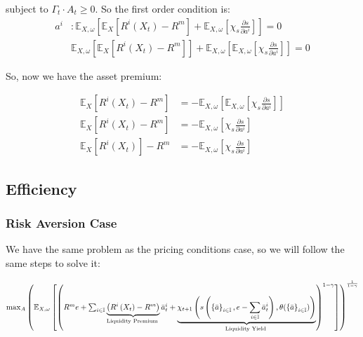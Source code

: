 \begin{flushleft}
{\small subject to $\Gamma_{t}\cdot A_{t}\geq0$. So the first order
condition is:}
\begin{align*}
a^{i} & :\mathbb{E}_{X,\omega}\left[\mathbb{E}_{X}\left[R^{i}\left(X_{t}\right)-R^{m}\right]+\mathbb{E}_{X,\omega}\left[\chi_{s}\frac{\partial s}{\partial a^{i}}\right]\right]=0\\
 & \mathbb{E}_{X,\omega}\left[\mathbb{E}_{X}\left[R^{i}\left(X_{t}\right)-R^{m}\right]\right]+\mathbb{E}_{X,\omega}\left[\mathbb{E}_{X,\omega}\left[\chi_{s}\frac{\partial s}{\partial a^{i}}\right]\right]=0
\end{align*}
\par\end{flushleft}

{\small So, now we have the asset premium:}{\small\par}
\begin{center}
\begin{align*}
\mathbb{E}_{X}\left[R^{i}\left(X_{t}\right)-R^{m}\right] & =-\mathbb{E}_{X,\omega}\left[\mathbb{E}_{X,\omega}\left[\chi_{s}\frac{\partial s}{\partial a^{i}}\right]\right]\\
\mathbb{E}_{X}\left[R^{i}\left(X_{t}\right)-R^{m}\right] & =-\mathbb{E}_{X,\omega}\left[\chi_{s}\frac{\partial s}{\partial a^{i}}\right]\\
\mathbb{E}_{X}\left[R^{i}\left(X_{t}\right)\right]-R^{m} & =-\mathbb{E}_{X,\omega}\left[\chi_{s}\frac{\partial s}{\partial a^{i}}\right]
\end{align*}
\par\end{center}

\subsection{Efficiency}

\subsubsection{Risk Aversion Case}

{\small We have the same problem as the pricing conditions case, so
we will follow the same steps to solve it:}{\small\par}
\begin{center}
{\small$\max_{A}\left(\mathbb{E}_{X,\omega}\left[\left(R^{m}e+\sum_{i\in\mathbb{I}}\underbrace{\left(R^{i}\left(X_{t}\right)-R^{m}\right)}_{\text{Liquidity Premium }}\bar{a}_{t}^{i}+\text{\text{\ensuremath{\underbrace{\chi_{t+1}\left(s\left(\left\{  \bar{a}\right\}  _{i\in\mathbb{I}},e-\sum_{i\in\mathbb{I}}\bar{a}{}_{t}^{i}\right),\theta(\left\{  \bar{a}\right\}  _{i\in\mathbb{I}})\right)}_{\text{Liquidity Yield }}}}}\right)^{1-\gamma}\right]\right)^{\frac{1}{1-\gamma}}$}{\small\par}
\par\end{center}

